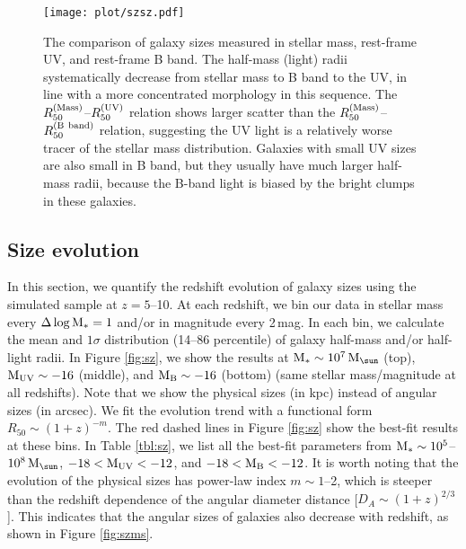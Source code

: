 \documentclass[useAMS,usenatbib]{mn2e}
\newcommand{\Ms}{{\rm M}_{\ast}}
\newcommand{\Msun}{{\rm M}_{\sun}}
\begin{document}
\begin{figure*}
\centering
\texttt{[image: plot/szsz.pdf]}
\caption{The comparison of galaxy sizes measured in stellar mass, rest-frame UV, and rest-frame B band. The half-mass (light) radii systematically decrease from stellar mass to B band to the UV, in line with a more concentrated morphology in this sequence. The $R_{50}^{\rm (Mass)}$--$R_{50}^{\rm (UV)}$ relation shows larger scatter than the $R_{50}^{\rm (Mass)}$--$R_{50}^{\rm (B~band)}$ relation, suggesting the UV light is a relatively worse tracer of the stellar mass distribution. Galaxies with small UV sizes are also small in B band, but they usually have much larger half-mass radii, because the B-band light is biased by the bright clumps in these galaxies.}
\label{fig:szsz}
\end{figure*}

\subsection{Size evolution}
\label{sec:evolution}
In this section, we quantify the redshift evolution of galaxy sizes using the simulated sample at $z=5$--10. At each redshift, we bin our data in stellar mass every $\Delta\log\Ms=1$ and/or in magnitude every 2\,mag. In each bin, we calculate the mean and $1\sigma$ distribution (14--86 percentile) of galaxy half-mass and/or half-light radii. In Figure \ref{fig:sz}, we show the results at $\Ms\sim10^7\,\Msun$ (top), $\rm M_{UV}\sim-16$ (middle), and $\rm M_B\sim-16$ (bottom) (same stellar mass/magnitude at all redshifts). Note that we show the physical sizes (in kpc) instead of angular sizes (in arcsec). We fit the evolution trend with a functional form $R_{50}\sim(1+z)^{-m}$. The red dashed lines in Figure \ref{fig:sz} show the best-fit results at these bins. In Table \ref{tbl:sz}, we list all the best-fit parameters from $\Ms\sim10^5$--$10^{8}\,\Msun$, $-18<\rm M_{UV}<-12$, and $-18<\rm M_B<-12$. It is worth noting that the evolution of the physical sizes has power-law index $m\sim1$--2, which is steeper than the redshift dependence of the angular diameter distance [$D_A\sim(1+z)^{2/3}$]. This indicates that the angular sizes of galaxies also decrease with redshift, as shown in Figure \ref{fig:szms}.
\end{document}
